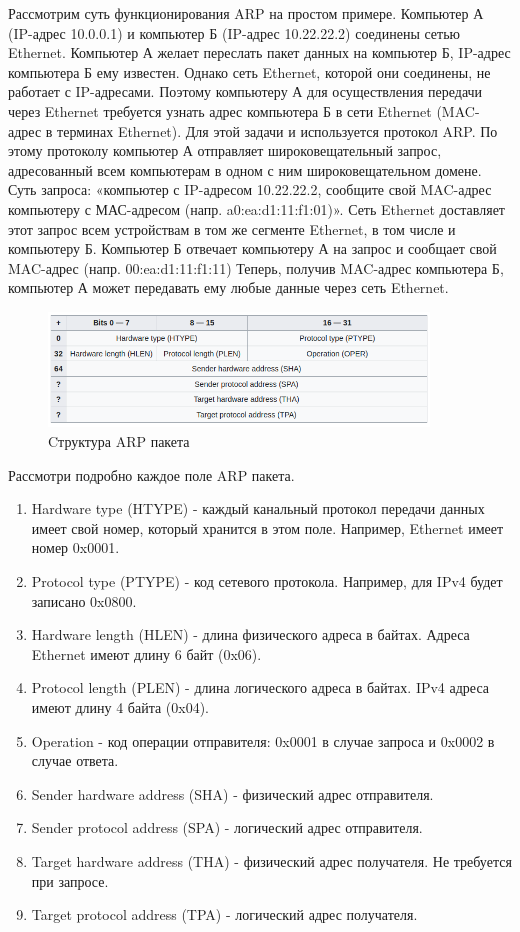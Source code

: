 Рассмотрим суть функционирования ARP на простом примере. Компьютер А (IP-адрес 10.0.0.1) и компьютер Б (IP-адрес 10.22.22.2) соединены сетью Ethernet. Компьютер А желает переслать пакет данных на компьютер Б, IP-адрес компьютера Б ему известен. Однако сеть Ethernet, которой они соединены, не работает с IP-адресами. Поэтому компьютеру А для осуществления передачи через Ethernet требуется узнать адрес компьютера Б в сети Ethernet (MAC-адрес в терминах Ethernet). Для этой задачи и используется протокол ARP. По этому протоколу компьютер А отправляет широковещательный запрос, адресованный всем компьютерам в одном с ним широковещательном домене. Суть запроса: «компьютер с IP-адресом 10.22.22.2, сообщите свой MAC-адрес компьютеру с МАС-адресом (напр. a0:ea:d1:11:f1:01)». Сеть Ethernet доставляет этот запрос всем устройствам в том же сегменте Ethernet, в том числе и компьютеру Б. Компьютер Б отвечает компьютеру А на запрос и сообщает свой MAC-адрес (напр. 00:ea:d1:11:f1:11) Теперь, получив MAC-адрес компьютера Б, компьютер А может передавать ему любые данные через сеть Ethernet.

\begin{figure}[h]
	\centering
	\includegraphics[width=0.9\textwidth]{image/arp}
	\caption{Cтруктура ARP пакета}
	\label{ARP_PROTOCOL}
\end{figure}

Рассмотри подробно каждое поле ARP пакета.

\begin{enumerate}
	\item Hardware type (HTYPE) - каждый канальный протокол передачи данных имеет свой номер, который хранится в этом поле. Например, Ethernet имеет номер 0x0001.
	\item Protocol type (PTYPE) - код сетевого протокола. Например, для IPv4 будет записано 0x0800.
	\item Hardware length (HLEN) - длина физического адреса в байтах. Адреса Ethernet имеют длину 6 байт (0x06).
	\item Protocol length (PLEN) - длина логического адреса в байтах. IPv4 адреса имеют длину 4 байта (0x04).
	\item Operation - код операции отправителя: 0x0001 в случае запроса и 0x0002 в случае ответа.
	\item Sender hardware address (SHA) - физический адрес отправителя.
	\item Sender protocol address (SPA) - логический адрес отправителя.
	\item Target hardware address (THA) - физический адрес получателя. Не требуется при запросе.
	\item Target protocol address (TPA) - логический адрес получателя.
\end{enumerate}

